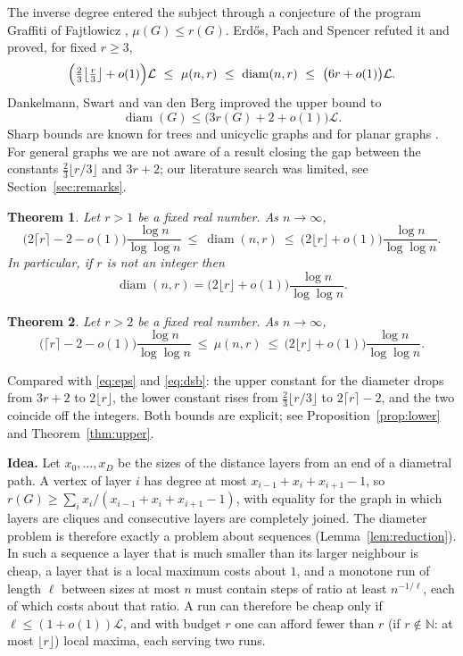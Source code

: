 \documentclass[11pt]{amsart}
\newtheorem{theorem}{Theorem}[section]
\theoremstyle{definition}
\theoremstyle{remark}
\newcommand{\diam}{\operatorname{diam}}
\newcommand{\N}{\mathbb{N}}
\newcommand{\Lz}{\mathcal{L}}
\begin{document}
The inverse degree entered the subject through a conjecture of the program Graffiti of Fajtlowicz \cite{F88}, $\mu(G)\le r(G)$.
Erd\H{o}s, Pach and Spencer \cite{EPS} refuted it and proved, for fixed $r\ge3$,
\begin{equation}\label{eq:eps}
\Bigl(\tfrac23\bigl\lfloor\tfrac r3\bigr\rfloor+o(1)\Bigr)\Lz\ \le\ \mu(n,r)\ \le\ \diam(n,r)\ \le\ \bigl(6r+o(1)\bigr)\Lz .
\end{equation}
Dankelmann, Swart and van den Berg \cite{DSB} improved the upper bound to
\begin{equation}\label{eq:dsb}
\diam(G)\le\bigl(3r(G)+2+o(1)\bigr)\Lz .
\end{equation}
Sharp bounds are known for trees and unicyclic graphs \cite{LS,M10} and for planar graphs \cite{FMP}.
For general graphs we are not aware of a result closing the gap between the constants $\tfrac23\lfloor r/3\rfloor$ and $3r+2$; our literature search was limited, see Section~\ref{sec:remarks}.

\begin{theorem}\label{thm:main}
Let $r>1$ be a fixed real number. As $n\to\infty$,
\[
\bigl(2\lceil r\rceil-2-o(1)\bigr)\frac{\log n}{\log\log n}\ \le\ \diam(n,r)\ \le\ \bigl(2\lfloor r\rfloor+o(1)\bigr)\frac{\log n}{\log\log n}.
\]
In particular, if $r$ is not an integer then
\[
\diam(n,r)=\bigl(2\lfloor r\rfloor+o(1)\bigr)\frac{\log n}{\log\log n}.
\]
\end{theorem}

\begin{theorem}\label{thm:mean}
Let $r>2$ be a fixed real number. As $n\to\infty$,
\[
\bigl(\lceil r\rceil-2-o(1)\bigr)\frac{\log n}{\log\log n}\ \le\ \mu(n,r)\ \le\ \bigl(2\lfloor r\rfloor+o(1)\bigr)\frac{\log n}{\log\log n}.
\]
\end{theorem}

Compared with \eqref{eq:eps} and \eqref{eq:dsb}: the upper constant for the diameter drops from $3r+2$ to $2\lfloor r\rfloor$, the lower constant rises from $\tfrac23\lfloor r/3\rfloor$ to $2\lceil r\rceil-2$, and the two coincide off the integers.
Both bounds are explicit; see Proposition~\ref{prop:lower} and Theorem~\ref{thm:upper}.

\medskip\noindent\textbf{Idea.}
Let $x_0,\dots,x_D$ be the sizes of the distance layers from an end of a diametral path. A vertex of layer $i$ has degree at most $x_{i-1}+x_i+x_{i+1}-1$, so
$r(G)\ge\sum_i x_i/(x_{i-1}+x_i+x_{i+1}-1)$, with equality for the graph in which layers are cliques and consecutive layers are completely joined.
The diameter problem is therefore exactly a problem about sequences (Lemma~\ref{lem:reduction}).
In such a sequence a layer that is much smaller than its larger neighbour is cheap, a layer that is a local maximum costs about $1$, and a monotone run of length $\ell$ between sizes at most $n$ must contain steps of ratio at least $n^{-1/\ell}$, each of which costs about that ratio.
A run can therefore be cheap only if $\ell\le(1+o(1))\Lz$, and with budget $r$ one can afford fewer than $r$ (if $r\notin\N$: at most $\lfloor r\rfloor$) local maxima, each serving two runs.
\end{document}
